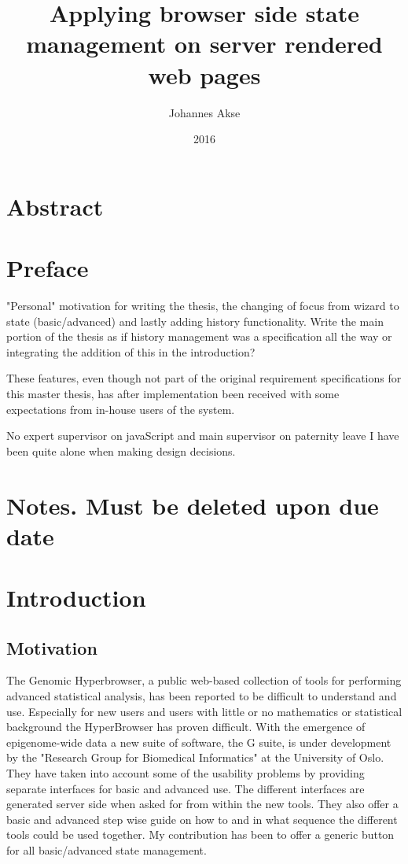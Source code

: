 \documentclass[english]{ifimaster}
\title{Applying browser side state management on server rendered web pages}
\subtitle{}
\author{Johannes Akse}
\date{2016}
\begin{document}
\maketitle{}
\chapter*{Abstract}
\tableofcontents
\nocite{*}

\chapter*{Preface}
"Personal" motivation for writing the thesis, the changing of focus from wizard to state (basic/advanced) and lastly adding history functionality. Write the main portion of the thesis as if history management was a specification all the way or integrating the addition of this in the introduction?

These features, even though not part of the original requirement specifications for this master thesis, has after implementation been received with some expectations from in-house users of the system. 

No expert supervisor on javaScript and main supervisor on paternity leave I have been quite alone when making design decisions. 
\chapter{Notes. Must be deleted upon due date}

   

\chapter{Introduction}
\section{Motivation}
The Genomic Hyperbrowser, a public web-based collection of tools for performing advanced statistical analysis, has been reported to be difficult to understand and use. Especially for new users and users with little or no mathematics or statistical background the HyperBrowser has proven difficult. With the emergence of epigenome-wide data a new suite of software, the G suite, is under development by the "Research Group for Biomedical Informatics" at the University of Oslo\parencite{gsuite}. They have taken into account some of the usability problems by providing separate interfaces for basic and advanced use. The different interfaces are generated server side when asked for from within the new tools. They also offer a basic and advanced step wise guide on how to and in what sequence the different tools could be used together. My contribution has been to offer a generic button for all basic/advanced state management.
\end{document}

